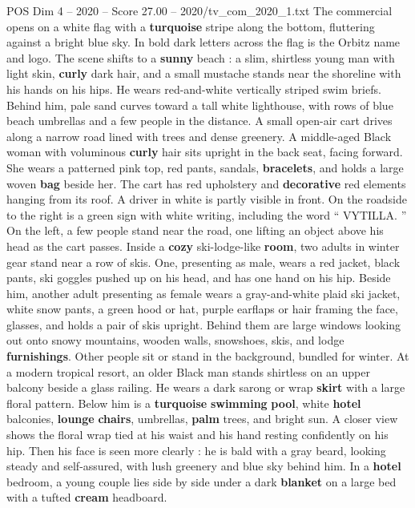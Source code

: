 \begin{textsample}{POS Dim 4 – 2020 – Score 27.00 – 2020/tv\_com\_2020\_1.txt}  \label{ex:f4_pos_001}
The commercial opens on a white flag with a \textbf{turquoise} stripe along the bottom, fluttering against a bright blue sky.
In bold dark letters across the flag is the Orbitz name and logo.
The scene shifts to a \textbf{sunny} beach : a slim, shirtless young man with light skin, \textbf{curly} dark hair, and a small mustache stands near the shoreline with his hands on his hips.
He wears red-and-white vertically striped swim briefs.
Behind him, pale sand curves toward a tall white lighthouse, with rows of blue beach umbrellas and a few people in the distance.
A small open-air cart drives along a narrow road lined with trees and dense greenery.
A middle-aged Black woman with voluminous \textbf{curly} hair sits upright in the back seat, facing forward.
She wears a patterned pink top, red pants, sandals, \textbf{bracelets}, and holds a large woven \textbf{bag} beside her.
The cart has red upholstery and \textbf{decorative} red elements hanging from its roof.
A driver in white is partly visible in front.
On the roadside to the right is a green sign with white writing, including the word “ VYTILLA. ” On the left, a few people stand near the road, one lifting an object above his head as the cart passes.
Inside a \textbf{cozy} ski-lodge-like \textbf{room}, two adults in winter gear stand near a row of skis.
One, presenting as male, wears a red jacket, black pants, ski goggles pushed up on his head, and has one hand on his hip.
Beside him, another adult presenting as female wears a gray-and-white plaid ski jacket, white snow pants, a green hood or hat, purple earflaps or hair framing the face, glasses, and holds a pair of skis upright.
Behind them are large windows looking out onto snowy mountains, wooden walls, snowshoes, skis, and lodge \textbf{furnishings}.
Other people sit or stand in the background, bundled for winter.
At a modern tropical resort, an older Black man stands shirtless on an upper balcony beside a glass railing.
He wears a dark sarong or wrap \textbf{skirt} with a large floral pattern.
Below him is a \textbf{turquoise} \textbf{swimming} \textbf{pool}, white \textbf{hotel} balconies, \textbf{lounge} \textbf{chairs}, umbrellas, \textbf{palm} trees, and bright sun.
A closer view shows the floral wrap tied at his waist and his hand resting confidently on his hip.
Then his face is seen more clearly : he is bald with a gray beard, looking steady and self-assured, with lush greenery and blue sky behind him.
In a \textbf{hotel} bedroom, a young couple lies side by side under a dark \textbf{blanket} on a large bed with a tufted \textbf{cream} headboard.

\end{textsample}
